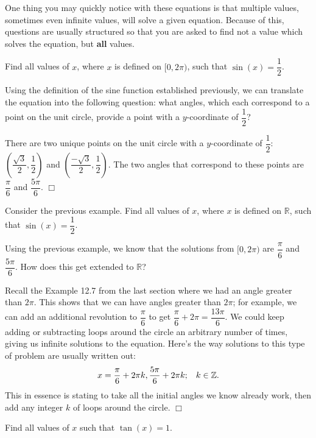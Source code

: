 \documentclass[lang=en,11pt]{elegantbook}
\begin{document}
One thing you may quickly notice with these equations is that multiple values, sometimes even infinite values, will solve a given equation. Because of this, questions are usually structured so that you are asked to find not a value which solves the equation, but \textbf{all} values.
\begin{example}
Find all values of $x$, where $x$ is defined on $[0,2\pi)$, such that $\sin(x)=\dfrac{1}{2}$.
\end{example}
\begin{solution}
Using the definition of the sine function established previously, we can translate the equation into the following question: what angles, which each correspond to a point on the unit circle, provide a point with a $y$-coordinate of $\dfrac{1}{2}$?

There are two unique points on the unit circle with a $y$-coordinate of $\dfrac{1}{2}$: $\left(\dfrac{\sqrt{3}}{2},\dfrac{1}{2}\right)$ and $\left(\dfrac{-\sqrt{3}}{2},\dfrac{1}{2}\right)$. The two angles that correspond to these points are $\dfrac{\pi}{6}$ and $\dfrac{5\pi}{6}$. $\Box$
\end{solution}
\begin{example}
Consider the previous example.  Find all values of $x$, where $x$ is defined on $\mathbb{R}$, such that $\sin(x)=\dfrac{1}{2}$.
\end{example}
\begin{solution}
Using the previous example, we know that the solutions from $[0,2\pi)$ are $\dfrac{\pi}{6}$ and $\dfrac{5\pi}{6}$. How does this get extended to $\mathbb{R}$?

Recall the Example 12.7 from the last section where we had an angle greater than $2\pi$. This shows that we can have angles greater than $2\pi$; for example, we can add an additional revolution to $\dfrac{\pi}{6}$ to get $\dfrac{\pi}{6}+2\pi=\dfrac{13\pi}{6}$. We could keep adding or subtracting loops around the circle an arbitrary number of times, giving us infinite solutions to the equation. Here’s the way solutions to this type of problem are usually written out: $$x=\dfrac{\pi}{6}+2\pi k,\dfrac{5\pi}{6}+2\pi k; \hspace{3mm} k\in\mathbb{Z}.$$ This in essence is stating to take all the initial angles we know already work, then add any integer $k$ of loops around the circle. $\Box$
\end{solution}
\begin{example}
Find all values of $x$ such that $\tan(x)=1$.
\end{example}
\end{document}
